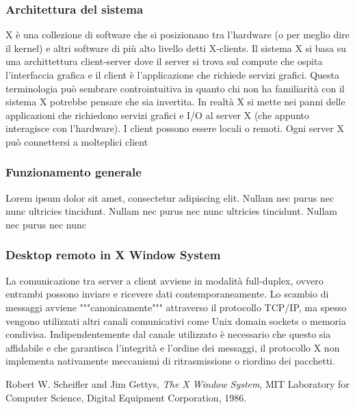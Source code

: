 \documentclass[12pt,a4paper,openright,twoside]{book}
\begin{document}
\subsubsection{Architettura del sistema}

X è una collezione di software che si posizionano tra l'hardware (o per meglio dire il kernel) e altri software di più alto livello detti X-clients. Il sistema X si basa su una archittettura client-server dove il server si trova sul compute che ospita l'interfaccia grafica e il client è l'applicazione che richiede servizi grafici. Questa terminologia può sembrare controintuitiva in quanto chi non ha familiarità con il sistema X potrebbe pensare che sia invertita. In realtà X si mette nei panni delle applicazioni che richiedono servizi grafici e I/O al server X (che appunto interagisce con l'hardware).
I client possono essere locali o remoti. Ogni server X può connettersi a molteplici client 

\subsubsection{Funzionamento generale}

Lorem ipsum dolor sit amet, consectetur adipiscing elit. Nullam nec purus nec nunc ultricies tincidunt. Nullam nec purus nec nunc ultricies tincidunt. Nullam nec purus nec nunc

\subsubsection{Desktop remoto in X Window System}

La comunicazione tra server a client avviene in modalità full-duplex, ovvero entrambi possono inviare e ricevere dati contemporaneamente. Lo scambio di messaggi avviene """canonicamente""" attraverso il protocollo TCP/IP, ma spesso vengono utilizzati altri canali comunicativi come Unix domain sockets o memoria condivisa. Indipendentemente dal canale utilizzato è necessario che questo sia affidabile e che garantisca l'integrità e l'ordine dei messaggi, il protocollo X non implementa nativamente meccanismi di ritrasmissione o riordino dei pacchetti.

\begin{thebibliography}{9}
Robert W. Scheifler and Jim Gettys, 
\textit{The X Window System}, 
MIT Laboratory for Computer Science, Digital Equipment Corporation, 1986.
\end{thebibliography}
\end{document}
